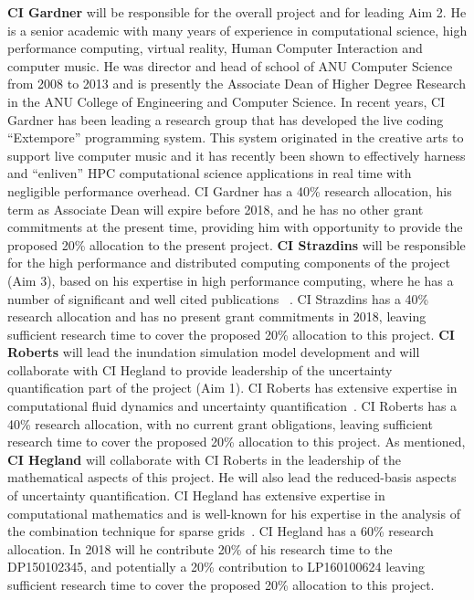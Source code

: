 {\bf CI Gardner} will be responsible for the overall project and for leading Aim 2. He is a senior
academic with many years of experience in computational science, high
performance computing, virtual reality, Human Computer Interaction and
computer music. He was director and head of school of ANU Computer
Science from 2008 to 2013 and is presently the Associate Dean of
Higher Degree Research in the ANU College of Engineering and Computer
Science. In recent years, CI Gardner has been leading a research group
that has developed the live coding ``Extempore'' programming
system. This system originated in the creative arts to support live
computer music and it has recently been shown to effectively harness and
``enliven'' HPC computational science applications in
real time with negligible performance overhead. CI Gardner has a 40\%
research allocation, his term as Associate Dean will expire before 2018, and
he has no other grant commitments at the present time, 
providing him with opportunity to provide the proposed 20\% allocation
to the present project. 
%
{\bf CI Strazdins} will be responsible for the high performance and
distributed computing components of the project (Aim 3), based on his
expertise in high performance computing, where he has a number of
significant and well cited publications
~\parencite{AliEtal2015,sgctalg15,Ali11022016}.  CI Strazdins
has a 40\% research allocation and has no present grant commitments in 2018, leaving sufficient research time to
cover the proposed 20\% allocation to this project.
%
{\bf CI Roberts} will lead the inundation simulation model development and will 
collaborate with CI Hegland to provide leadership of the 
uncertainty quantification part of the project (Aim 1). CI Roberts has extensive 
expertise in computational
fluid dynamics and uncertainty
quantification~\parencite{deBaarRDM2015,JakemanRoberts2013,anugamanual,nielsen2005hydrodynamic}.
CI Roberts has a 40\% research allocation, with no current grant
obligations, leaving sufficient research time to cover the proposed
20\% allocation to this project.
%
As mentioned, {\bf CI Hegland} will collaborate with CI Roberts in the leadership of the mathematical aspects of
this project. He will also lead the reduced-basis aspects of uncertainty quantification. CI Hegland has extensive expertise in
computational mathematics and is well-known for his expertise in the analysis
of the combination technique for sparse
grids~\parencite{AliEtal2015,HardingHLS2015,Ali11022016}.  CI Hegland
has a 60\% research allocation. In 2018 will he contribute 20\% of his
research time to the DP150102345, and potentially a 20\% contribution
to LP160100624 leaving sufficient research time to cover the proposed
20\% allocation to this project.


